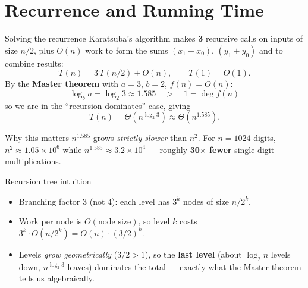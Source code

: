 \documentclass[11pt,aspectratio=169]{beamer}
\begin{document}
\section{Recurrence and Running Time}

\begin{frame}{Solving the recurrence}
  Karatsuba's algorithm makes \textbf{3} recursive calls on inputs of size $n/2$, plus
  $O(n)$ work to form the sums $(x_1+x_0)$, $(y_1+y_0)$ and to combine results:
  \[
    T(n) = 3\,T(n/2) + O(n), \qquad T(1) = O(1).
  \]
  By the \textbf{Master theorem} with $a = 3$, $b = 2$, $f(n) = O(n)$:
  \[
    \log_b a = \log_2 3 \approx 1.585 \quad > \quad 1 = \deg f(n)
  \]
  so we are in the ``recursion dominates'' case, giving
  \[
    \boxed{T(n) = \Theta\!\left(n^{\log_2 3}\right) \approx \Theta(n^{1.585}).}
  \]
  \begin{alertblock}{Why this matters}
    $n^{1.585}$ grows \emph{strictly slower} than $n^2$. For $n = 1024$ digits,
    $n^2 \approx 1.05 \times 10^6$ while $n^{1.585} \approx 3.2\times10^4$ --- roughly
    \textbf{30$\times$ fewer} single-digit multiplications.
  \end{alertblock}
\end{frame}

\begin{frame}{Recursion tree intuition}
  \begin{center}
  \end{center}
  \begin{itemize}
    \item Branching factor $3$ (not $4$): each level has $3^k$ nodes of size $n/2^k$.
    \item Work per node is $O(\text{node size})$, so level $k$ costs
    $3^k \cdot O(n/2^k) = O(n) \cdot (3/2)^k$.
    \item Levels \emph{grow geometrically} ($3/2 > 1$), so the \textbf{last level}
    (about $\log_2 n$ levels down, $n^{\log_2 3}$ leaves) dominates the total ---
    exactly what the Master theorem tells us algebraically.
  \end{itemize}
\end{frame}
\end{document}
